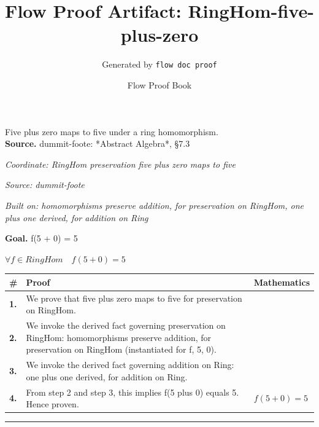 \documentclass[11pt]{article}
\title{Flow Proof Artifact: RingHom-five-plus-zero}
\author{Generated by \texttt{flow doc proof}}
\date{Flow Proof Book}
\theoremstyle{definition}
\begin{document}
\maketitle
Five plus zero maps to five under a ring homomorphism.\\[0.5em]
\textbf{Source.} dummit-foote: *Abstract Algebra*, §7.3\\[0.5em]
\bigskip
{}\par
\smallskip\noindent\textit{Coordinate: RingHom \cdot preservation \cdot five plus zero maps to five}\par
\smallskip\noindent\textit{Source: dummit-foote}\par
\smallskip\noindent\textit{Built on: homomorphisms preserve addition, for preservation on RingHom, one plus one derived, for addition on Ring}\par
\medskip
\noindent\textbf{Goal.} f(5 + 0) = 5\par
\noindent$\displaystyle \forall f \in RingHom\quad f(5 + 0) = 5$\par
\medskip
\noindent
\begin{tabular}{@{} >{\raggedright\arraybackslash}p{} >{\raggedright\arraybackslash}p{} >{\raggedleft\arraybackslash}p{} @{}}
\textbf{\#} & \textbf{Proof} & \textbf{Mathematics} \\
\midrule
\textbf{1.} & We prove that five plus zero maps to five for preservation on RingHom. & \\[0.45em]
\textbf{2.} & We invoke the derived fact governing preservation on RingHom: homomorphisms preserve addition, for preservation on RingHom (instantiated for f, 5, 0). & \\[0.45em]
\textbf{3.} & We invoke the derived fact governing addition on Ring: one plus one derived, for addition on Ring. & \\[0.45em]
\textbf{4.} & From step 2 and step 3, this implies f(5 plus 0) equals 5. Hence proven. & $\displaystyle f(5 + 0) = 5$ \\[0.45em]
\bottomrule
\end{tabular}
\label{thm:RingHom-preservation-five_plus_zero_maps_to_five}
\par\medskip\hrule
\end{document}
